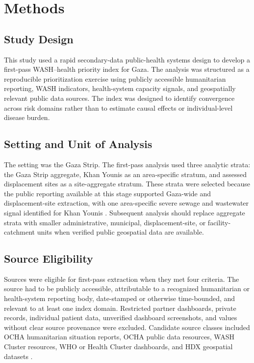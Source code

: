 \section{Methods}

\subsection{Study Design}

This study used a rapid secondary-data public-health systems design to develop a first-pass WASH--health priority index for Gaza. The analysis was structured as a reproducible prioritization exercise using publicly accessible humanitarian reporting, WASH indicators, health-system capacity signals, and geospatially relevant public data sources. The index was designed to identify convergence across risk domains rather than to estimate causal effects or individual-level disease burden.

\subsection{Setting and Unit of Analysis}

The setting was the Gaza Strip. The first-pass analysis used three analytic strata: the Gaza Strip aggregate, Khan Younis as an area-specific stratum, and assessed displacement sites as a site-aggregate stratum. These strata were selected because the public reporting available at this stage supported Gaza-wide and displacement-site extraction, with one area-specific severe sewage and wastewater signal identified for Khan Younis \citep{ocha_2026_may15}. Subsequent analysis should replace aggregate strata with smaller administrative, municipal, displacement-site, or facility-catchment units when verified public geospatial data are available.

\subsection{Source Eligibility}

Sources were eligible for first-pass extraction when they met four criteria. The source had to be publicly accessible, attributable to a recognized humanitarian or health-system reporting body, date-stamped or otherwise time-bounded, and relevant to at least one index domain. Restricted partner dashboards, private records, individual patient data, unverified dashboard screenshots, and values without clear source provenance were excluded. Candidate source classes included OCHA humanitarian situation reports, OCHA public data resources, WASH Cluster resources, WHO or Health Cluster dashboards, and HDX geospatial datasets \citep{ocha_2026_apr17,ocha_2026_may15,who_emro_dashboards_2026,wash_cluster_palestine_2026,hdx_palestine_health_2026}.

